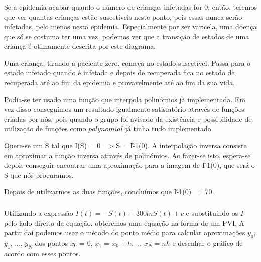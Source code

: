\documentclass[portuguese, a4paper]{article}
\begin{document}
		\subsubsection{}
		\par
		Se a epidemia acabar quando o número de crianças infetadas for 0, então, teremos
		que ver quantas crianças estão suscetíveis neste ponto, pois essas nunca serão infetadas, pelo menos nesta
		epidemia. Especialmente por ser varicela, uma doença que só se costuma ter uma vez,
		podemos ver que a transição de estados de uma criança
		é otimamente descrita por este diagrama.

		Uma criança, tirando a paciente zero, começa no estado suscetível. Passa
		para o estado infetado quando é infetada e depois de recuperada fica no estado de recuperada até ao fim da
		epidemia e provavelmente até ao fim da sua vida.


		Podia-se ter usado uma função que interpola polinómios já implementada.
		Em vez disso conseguímos um resultado igualmente satisfatório através de funções criadas por nós, pois
		quando o grupo foi avisado da existência e possibilidade de utilização de funções como $polynomial$ %
		já tinha tudo implementado.

		Quere-se um S tal que I(S) = 0 => S = I\^-1(0).
		A interpolação inversa consiste em aproximar a função inversa através de polinómios.
		Ao fazer-se isto, espera-se depois conseguir encontrar uma aproximação
		para a imagem de I\^-1(0), 
		que será o S que nós procuramos.
		\par
		Depois de utilizarmos as duas funções, concluímos que I\^-1(0) ~= 70.
		
		\subsubsection{}
		\par
		
		Utilizando a expressão $I(t) = -S(t) + 300 ln S(t) + c$ e substituindo
		os $I$ pelo lado direito da equação, obteremos uma equação na forma de um 
		PVI. A partir daí podemos usar o método do ponto médio para calcular aproximações $y_0$, $y_1$, ..., $y_N$ dos pontos
		$x_0$ = 0, $x_1$ = $x_0 + h$, ... $x_N= nh$ e desenhar o gráfico de acordo com esses pontos.
		
\end{document}

